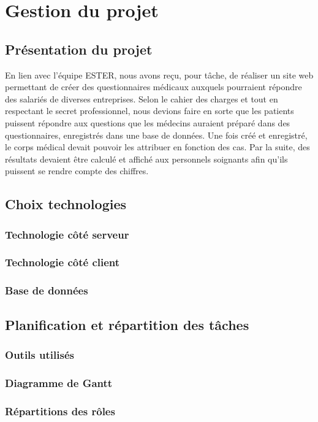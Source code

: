 \chapter{Gestion du projet}

\section{Présentation du projet}

En lien avec l'équipe ESTER, nous avons reçu, pour tâche, de réaliser un site web permettant de créer des questionnaires médicaux auxquels pourraient répondre des salariés de diverses entreprises. Selon le cahier des charges et tout en respectant le secret professionnel, nous devions faire en sorte que les patients puissent répondre aux questions que les médecins auraient préparé dans des questionnaires, enregistrés dans une base de données. Une fois créé et enregistré, le corps médical devait pouvoir les attribuer en fonction des cas. Par la suite, des résultats devaient être calculé et affiché aux personnels soignants afin qu'ils puissent se rendre compte des chiffres. 

\section{Choix technologies}

\subsection{Technologie côté serveur}


\subsection{Technologie côté client}

\subsection{Base de données}


\section{Planification et répartition des tâches}

\subsection{Outils utilisés}


\subsection{Diagramme de Gantt}


\subsection{Répartitions des rôles}